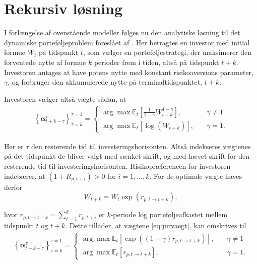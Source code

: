\documentclass[
  a4paper,
  oneside]{memoir}
\begin{document}
\hypertarget{rekloes}{%
\section{Rekursiv løsning}\label{rekloes}}

I forlængelse af ovenstående modeller følges nu den analytiske løsning til det dynamiske porteføljeproblem foreslået af \citep{JurVic2011}. Her betragtes en investor med initial formue \(W_t\) på tidspunkt \(t\), som vælger en porteføljestrategi, der maksimerer den forventede nytte af formue \(k\) perioder frem i tiden, altså på tidspunkt \(t+k\). Investoren antages at have potens nytte med konstant risikoaversions parameter, \(\gamma\), og forbruger den akkumulerede nytte på terminaltidspunktet, \(t+k\).

Investoren vælger altså vægte sådan, at
\begin{align}
\left\{\bm{\alpha}_{t+k-\tau}^\tau\right\}_{\tau=k}^{\tau=1}=
\begin{cases}
\arg\max\mathbb{E}_t\left[\frac{1}{1-\gamma}W_{t+k}^{1-\gamma}\right],\quad &\gamma\neq 1\\
\arg\max\mathbb{E}_t\left[\log(W_{t+k})\right],\quad &\gamma=1.
\end{cases}\label{eq:jurvaegt}
\end{align}

Her er \(\tau\) den resterende tid til investeringshorisonten. Altså indekseres vægtenes på det tidspunkt de bliver valgt med sænket skrift, og med hævet skrift for den resterende tid til investeringshorisonten. Risikopræferencen for investoren indebærer, at \((1+R_{p,t+i})>0\) for \(i=1,\dots,k\). For de optimale vægte haves derfor
\begin{equation}
W_{t+k}=W_t\exp(r_{p,t\to t+k}),\label{eq:formuetk}
\end{equation}

hvor \(r_{p,t\to t+k}=\sum_{i=1}^k r_{p,t+i}\) er \(k\)-periode log porteføljeafkastet mellem tidspunkt \(t\) og \(t+k\). Dette tillader, at vægtene \eqref{eq:jurvaegt}, kan omskrives til
\begin{align}
\left\{\bm{\alpha}_{t+k-\tau}^\tau\right\}_{\tau=k}^{\tau=1}=\begin{cases}
\arg\max\mathbb{E}_t\left[\exp ((1-\gamma) r_{p,t\to t+k})\right],\quad &\gamma\neq 1\\
\arg\max\mathbb{E}_t\left[r_{p,t\to t+k}\right],\quad &\gamma=1.
\end{cases}\label{eq:jurvaegt2}
\end{align}
\end{document}
